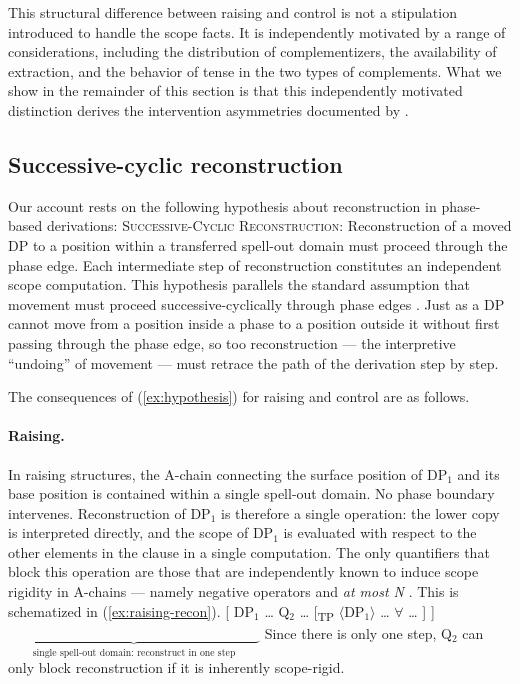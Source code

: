 \documentclass[12pt]{article}
\begin{document}
This structural difference between raising and control is not a stipulation introduced to handle the scope facts. It is independently motivated by a range of considerations, including the distribution of complementizers, the availability of extraction, and the behavior of tense in the two types of complements. What we show in the remainder of this section is that this independently motivated distinction derives the intervention asymmetries documented by \citeauthor{neeleman2006}.

\subsection{Successive-cyclic reconstruction}\label{sec:cyclic-recon}

Our account rests on the following hypothesis about reconstruction in phase-based derivations:
%
\ex\label{ex:hypothesis}
\textsc{Successive-Cyclic Reconstruction}: Reconstruction of a moved DP to a position within a transferred spell-out domain must proceed through the phase edge. Each intermediate step of reconstruction constitutes an independent scope computation.
\xe
%
This hypothesis parallels the standard assumption that movement must proceed successive-cyclically through phase edges \citep{chomsky2001}. Just as a DP cannot move from a position inside a phase to a position outside it without first passing through the phase edge, so too reconstruction --- the interpretive ``undoing'' of movement --- must retrace the path of the derivation step by step.

The consequences of (\ref{ex:hypothesis}) for raising and control are as follows.

\paragraph{Raising.} In raising structures, the A-chain connecting the surface position of DP$_1$ and its base position is contained within a single spell-out domain. No phase boundary intervenes. Reconstruction of DP$_1$ is therefore a single operation: the lower copy is interpreted directly, and the scope of DP$_1$ is evaluated with respect to the other elements in the clause in a single computation. The only quantifiers that block this operation are those that are independently known to induce scope rigidity in A-chains --- namely negative operators and \emph{at most N} \citep[cf.][]{fox1999}. This is schematized in (\ref{ex:raising-recon}).
%
\ex\label{ex:raising-recon}
{[} DP$_1$ \ldots{} Q$_2$ \ldots{} {[}\textsubscript{TP} $\langle$DP$_1\rangle$ \ldots{} $\forall$ \ldots{} {]} {]}\\[4pt]
$\underbrace{\hspace{18em}}_{\text{single spell-out domain: reconstruct in one step}}$
\xe
%
Since there is only one step, Q$_2$ can only block reconstruction if it is inherently scope-rigid.
\end{document}
